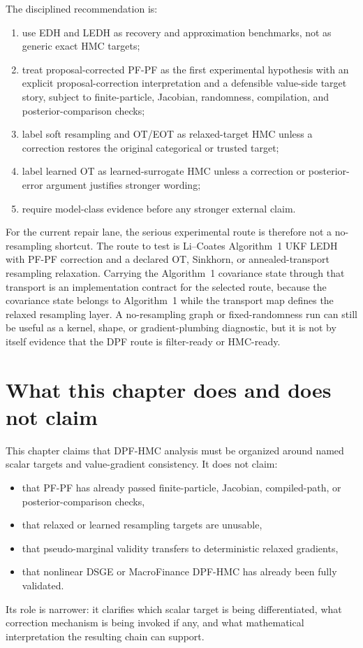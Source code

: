 The disciplined recommendation is:
\begin{enumerate}[label=(\roman*)]
  \item use EDH and LEDH as recovery and approximation benchmarks, not as
generic exact HMC targets;
  \item treat proposal-corrected PF-PF as the first experimental hypothesis with
    an explicit proposal-correction interpretation and a defensible value-side
    target story, subject to finite-particle, Jacobian, randomness,
    compilation, and posterior-comparison checks;
  \item label soft resampling and OT/EOT as relaxed-target HMC unless a
    correction restores the original categorical or trusted target;
  \item label learned OT as learned-surrogate HMC unless a correction or
    posterior-error argument justifies stronger wording;
  \item require model-class evidence before any stronger external claim.
\end{enumerate}

For the current repair lane, the serious experimental route is therefore not a
no-resampling shortcut.  The route to test is Li--Coates Algorithm~1 UKF LEDH
with PF-PF correction and a declared OT, Sinkhorn, or annealed-transport
resampling relaxation.  Carrying the Algorithm~1 covariance state through that
transport is an implementation contract for the selected route, because the
covariance state belongs to Algorithm~1 while the transport map defines the
relaxed resampling layer.  A no-resampling graph or fixed-randomness run can
still be useful as a kernel, shape, or gradient-plumbing diagnostic, but it is
not by itself evidence that the DPF route is filter-ready or HMC-ready.

\section{What this chapter does and does not claim}
\label{sec:bf-dpf-hmc-boundary}

This chapter claims that DPF-HMC analysis must be organized around named scalar
targets and value-gradient consistency.  It does not claim:
\begin{itemize}
  \item that PF-PF has already passed finite-particle, Jacobian, compiled-path,
    or posterior-comparison checks,
  \item that relaxed or learned resampling targets are unusable,
  \item that pseudo-marginal validity transfers to deterministic relaxed
    gradients,
  \item that nonlinear DSGE or MacroFinance DPF-HMC has already been fully
    validated.
\end{itemize}
Its role is narrower: it clarifies which scalar target is being differentiated,
what correction mechanism is being invoked if any, and what mathematical
interpretation the resulting chain can support.

\FloatBarrier
